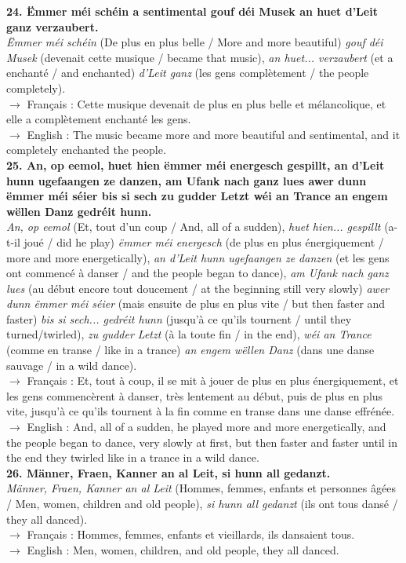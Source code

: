 \textbf{24. Ëmmer méi schéin a sentimental gouf déi Musek an huet d'Leit ganz verzaubert.}\\
\textit{Ëmmer méi schéin} (De plus en plus belle / More and more beautiful) \textit{gouf déi Musek} (devenait cette musique / became that music), \textit{an huet... verzaubert} (et a enchanté / and enchanted) \textit{d'Leit ganz} (les gens complètement / the people completely).\\
$\rightarrow$ Français : Cette musique devenait de plus en plus belle et mélancolique, et elle a complètement enchanté les gens.\\
$\rightarrow$ English : The music became more and more beautiful and sentimental, and it completely enchanted the people.\\[0.5em]

\textbf{25. An, op eemol, huet hien ëmmer méi energesch gespillt, an d'Leit hunn ugefaangen ze danzen, am Ufank nach ganz lues awer dunn ëmmer méi séier bis si sech zu gudder Letzt wéi an Trance an engem wëllen Danz gedréit hunn.}\\
\textit{An, op eemol} (Et, tout d'un coup / And, all of a sudden), \textit{huet hien... gespillt} (a-t-il joué / did he play) \textit{ëmmer méi energesch} (de plus en plus énergiquement / more and more energetically), \textit{an d'Leit hunn ugefaangen ze danzen} (et les gens ont commencé à danser / and the people began to dance), \textit{am Ufank nach ganz lues} (au début encore tout doucement / at the beginning still very slowly) \textit{awer dunn ëmmer méi séier} (mais ensuite de plus en plus vite / but then faster and faster) \textit{bis si sech... gedréit hunn} (jusqu'à ce qu'ils tournent / until they turned/twirled), \textit{zu gudder Letzt} (à la toute fin / in the end), \textit{wéi an Trance} (comme en transe / like in a trance) \textit{an engem wëllen Danz} (dans une danse sauvage / in a wild dance).\\
$\rightarrow$ Français : Et, tout à coup, il se mit à jouer de plus en plus énergiquement, et les gens commencèrent à danser, très lentement au début, puis de plus en plus vite, jusqu'à ce qu'ils tournent à la fin comme en transe dans une danse effrénée.\\
$\rightarrow$ English : And, all of a sudden, he played more and more energetically, and the people began to dance, very slowly at first, but then faster and faster until in the end they twirled like in a trance in a wild dance.\\[0.5em]

\textbf{26. Männer, Fraen, Kanner an al Leit, si hunn all gedanzt.}\\
\textit{Männer, Fraen, Kanner an al Leit} (Hommes, femmes, enfants et personnes âgées / Men, women, children and old people), \textit{si hunn all gedanzt} (ils ont tous dansé / they all danced).\\
$\rightarrow$ Français : Hommes, femmes, enfants et vieillards, ils dansaient tous.\\
$\rightarrow$ English : Men, women, children, and old people, they all danced.\\[0.5em]

